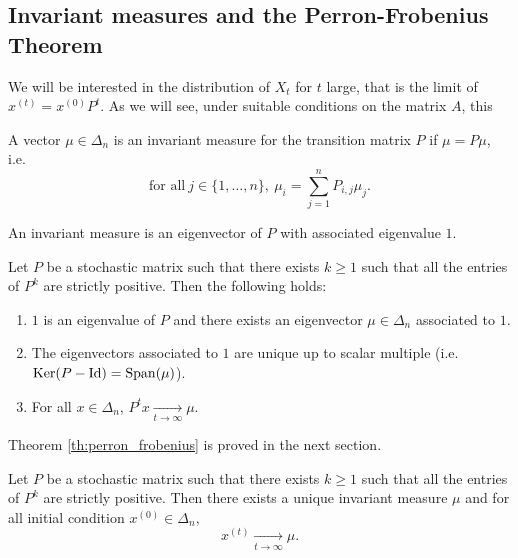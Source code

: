 \documentclass[11pt,nocut]{article}
\begin{document}
\subsection{Invariant measures and the Perron-Frobenius Theorem}
We will be interested in the distribution of $X_t$ for $t$ large, that is the limit of $x^{(t)} = x^{(0)} P^t$. As we will see, under suitable conditions on the matrix $A$, this

\begin{definition}
	A vector $\mu \in \Delta_n$ is an invariant measure for the transition matrix $P$ if $\mu = P \mu$, i.e.\
	$$
	\text{for all} \ j \in \{1, \dots, n\}, \ \mu_i = \sum_{j=1}^n P_{i,j} \mu_j.
	$$
\end{definition}

\begin{remark}
	An invariant measure is an eigenvector of $P$ with associated eigenvalue $1$.
\end{remark}


\begin{theorem}\label{th:perron_frobenius}
	Let $P$ be a stochastic matrix such that there exists $k \geq 1$ such that all the entries of $P^k$ are strictly positive. Then the following holds:
	\begin{enumerate}[label=(\roman*),noitemsep]
		\item\label{item:i} $1$ is an eigenvalue of $P$ and there exists an eigenvector $\mu \in \Delta_n$ associated to $1$.
		\item\label{item:ii} The eigenvectors associated to $1$ are unique up to scalar multiple (i.e.\ ${{\rm Ker}}(P-{{\rm Id}}) = {{\rm Span}}(\mu)$).
		\item\label{item:iii} For all $x \in \Delta_n$, $P^t x \xrightarrow[t \to \infty]{} \mu$.
	\end{enumerate}
\end{theorem}

Theorem \ref{th:perron_frobenius} is proved in the next section.

\begin{corollary}
	Let $P$ be a stochastic matrix such that there exists $k \geq 1$ such that all the entries of $P^k$ are strictly positive. Then there exists a unique invariant measure $\mu$ and for all initial condition $x^{(0)} \in \Delta_n$,
	$$
	x^{(t)} \xrightarrow[t \to \infty]{} \mu.
	$$
\end{corollary}
\end{document}
